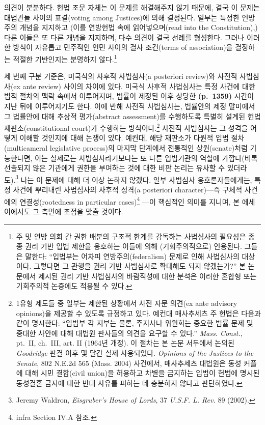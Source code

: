 \documentclass[a4paper,12pt,oneside]{article}  %
\begin{document}
의견이 분분하다. 헌법 조문 자체는 이 문제를 해결해주지 않기 때문에, 결국
이 문제는 대법관들 사이의 표결(voting among Justices)에 의해 결정된다.
일부는 특정한 연방주의 개념을 지지하고 (이를 연방헌법 속에
읽어넣으며(read into the Constitution),) 다른 이들은 또 다른 개념을
지지하며, 다수 의견이 결국 선례를 형성한다. 그러나 이러한 방식이
자유롭고 민주적인 인민 사이의 결사 조건(terms of association)을 결정하는
적절한 기반인지는 분명하지 않다.\footnote{주 및 연방 의회 간 권한 배분의
  구조적 한계를 감독하는 사법심사의 필요성은 종종 권리 기반 입법 제한을
  옹호하는 이들에 의해 (기회주의적으로) 인용된다. 그들은 말한다:
  ``입법부는 어차피 연방주의(federalism) 문제로 인해 사법심사의
  대상이다. 그렇다면 그 관행을 권리 기반 사법심사로 확대해도 되지
  않겠는가?'' 본 논문에서 제시된 권리 기반 사법심사의 바람직성에 대한
  분석은 이러한 혼합형 또는 기회주의적 논증에도 적용될 수 있다.}

세 번째 구분 기준은, 미국식의 사후적 사법심사(a posteriori review)와
사전적 사법심사(ex ante review) 사이의 차이에 있다. 미국식 사후적
사법심사는 특정 사건에 대한 법적 절차의 맥락 속에서 이루어지며, 법률이
제정된 이후 상당한 \textbf{(p.~1359)} 시간이 지난 뒤에 이루어지기도
한다. 이에 반해 사전적 사법심사는, 법률안의 제정 말미에서 그 법률안에
대해 추상적 평가(abstract assessment)를 수행하도록 특별히 설계된
헌법재판소(constitutional court)가 수행하는 방식이다.\footnote{1유형
  제도들 중 일부는 제한된 상황에서 사전 자문 의견(ex ante advisory
  opinions)을 제공할 수 있도록 규정하고 있다. 예컨대 매사추세츠 주
  헌법은 다음과 같이 명시한다: ``입법부 각 지부는 물론, 주지사나
  위원회는 중요한 법률 문제 및 중대한 사안에 대해 대법원 판사들의 의견을
  요구할 수 있다.'' \emph{Mass. Const.}, pt.~II, ch.~III, art. II
  (1964년 개정). 이 절차는 본 논문 서두에서 논의된 \emph{Goodridge} 판결
  이후 몇 달간 실제 사용되었다. \emph{Opinions of the Justices to the
  Senate}, 802 N.E.2d 565 (Mass. 2004) 사건에서, 매사추세츠 대법원은
  동성 커플에 대해 시민 결합(civil union)을 허용하고 차별을 금지하는
  입법이 헌법에 명시된 동성결혼 금지에 대한 반대 사유를 피하는 데
  충분하지 않다고 판단하였다.} 사전적 사법심사는 그 성격을 어떻게 이해할
것인지에 대해 논쟁이 있다. 예컨대, 해당 재판소가 다원적 입법
절차(multicameral legislative process)의 마지막 단계에서 전통적인
상원(senate)처럼 기능한다면, 이는 실제로는 사법심사라기보다는 또 다른
입법기관의 역할에 가깝다(비록 선출되지 않은 기관에게 권한을 부여하는
것에 대한 비판 논리는 유사할 수 있더라도).\footnote{Jeremy Waldron,
  \emph{Eisgruber's House of Lords}, 37 \emph{U.S.F. L. Rev.} 89 (2002).}
나는 이 문제에 대해 더 이상 논하지 않겠다. 일부 사법심사
옹호론자들에게는, 특정 사건에 뿌리내린 사법심사의 사후적 성격(a
posteriori character)---즉 구체적 사건에의 연결성(rootedness in
particular cases)\footnote{infra Section IV.A 참조.} ---이 핵심적인
의미를 지니며, 본 에세이에서도 그 측면에 초점을 맞출 것이다.
\end{document}
